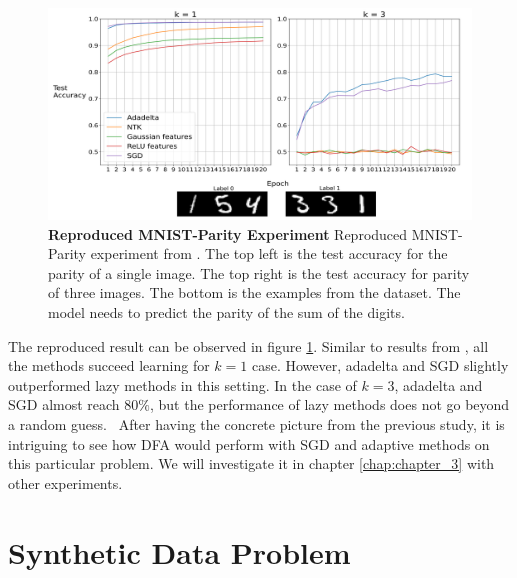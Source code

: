 \documentclass[a4paper, nobind]{templates/ociamthesis}
\begin{document}
\begin{figure}

{\centering \includegraphics[width=1\linewidth]{figures/2_k13_SGD_ada_BP_reproduced} 

}

\caption[Reproduced MNIST-Parity Experiment]{\textbf{Reproduced MNIST-Parity Experiment} \newline Reproduced MNIST-Parity experiment from \cite{DBLP:journals/corr/abs-2002-07400}. The top left is the test accuracy for the parity of a single image. The top right is the test accuracy for parity of three images. The bottom is the examples from the dataset. The model needs to predict the parity of the sum of the digits.}\label{fig:MNISTparity}
\end{figure}

\noindent The reproduced result can be observed in figure \ref{fig:MNISTparity}. Similar to results from \cite{DBLP:journals/corr/abs-2002-07400}, all the methods succeed learning for \(k=1\) case. However, adadelta and SGD slightly outperformed lazy methods in this setting. In the case of \(k=3\), adadelta and SGD almost reach \(80\%\), but the performance of lazy methods does not go beyond a random guess.~
After having the concrete picture from the previous study, it is intriguing to see how DFA would perform with SGD and adaptive methods on this particular problem. We will investigate it in chapter \ref{chap:chapter_3} with other experiments.

\hypertarget{synthetic-data-problem}{%
\section{Synthetic Data Problem}\label{synthetic-data-problem}}
\end{document}
